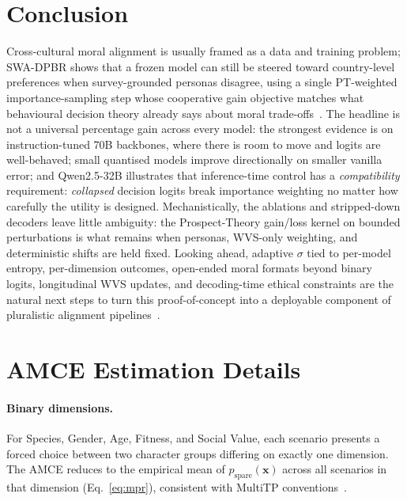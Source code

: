 \documentclass{article}
\begin{document}
\section{Conclusion}
\label{sec:conclusion}

Cross-cultural moral alignment is usually framed as a data and training
problem; SWA-DPBR shows that a frozen model can still be steered toward
country-level preferences when survey-grounded personas disagree, using a
single PT-weighted importance-sampling step whose cooperative gain objective
matches what behavioural decision theory already says about moral
trade-offs~\citep{kahneman1979prospect}.
The headline is not a universal percentage gain across every model: the
strongest evidence is on instruction-tuned 70B backbones, where there is room
to move and logits are well-behaved; small quantised models improve
directionally on smaller vanilla error; and Qwen2.5-32B illustrates that
inference-time control has a \emph{compatibility} requirement: \emph{collapsed}
decision logits break importance weighting no matter how carefully the utility
is designed.
Mechanistically, the ablations and stripped-down decoders leave little
ambiguity: the Prospect-Theory gain/loss kernel on bounded perturbations is
what remains when personas, WVS-only weighting, and deterministic shifts are
held fixed.
Looking ahead, adaptive $\sigma$ tied to per-model entropy, per-dimension
outcomes, open-ended moral formats beyond binary logits, longitudinal WVS
updates, and decoding-time ethical constraints are the natural next steps to
turn this proof-of-concept into a deployable component of pluralistic alignment
pipelines~\citep{sorensen2024roadmap}.




\newpage
\appendix

\section{AMCE Estimation Details}
\label{app:amce}

\paragraph{Binary dimensions.} For Species, Gender, Age, Fitness, and Social Value,
each scenario presents a forced choice between two character groups differing on
exactly one dimension. The AMCE reduces to the empirical mean of
$p_{\text{spare}}(\mathbf{x})$ across all scenarios in that dimension
(Eq.~\ref{eq:mpr}), consistent with MultiTP conventions~\citep{jin2025multitp}.
\end{document}
